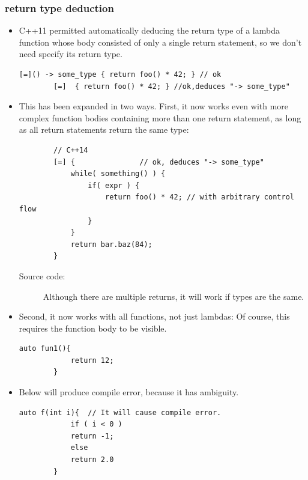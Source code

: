 \documentclass[a4paper,11pt,twoside]{book}
\begin{document}
\subsubsection{return type deduction}
\begin{itemize}
	\item C++11 permitted automatically deducing the return type of a lambda function whose body consisted of only a single return statement, so we don't need specify its return type.
	\begin{lstlisting}[numbers=none]
		[=]() -> some_type { return foo() * 42; } // ok
		[=]  { return foo() * 42; } //ok,deduces "-> some_type"
	\end{lstlisting}
	
	\item This has been expanded in two ways. First, it now works even with more complex function bodies containing more than one return statement, as long as all return statements return the same type:
	\begin{lstlisting}
		// C++14
		[=] {               // ok, deduces "-> some_type"
			while( something() ) {
				if( expr ) {
					return foo() * 42; // with arbitrary control flow
				}
			}
			return bar.baz(84); 
		}                       
	\end{lstlisting}
	\begin{description}
		\item[Source code:] Although there are multiple returns, it will work if types are the same.
	\end{description}
	
	\item Second, it now works with all functions, not just lambdas: Of course, this requires the function body to be visible.
	\begin{lstlisting}[numbers=none]
		auto fun1(){
			return 12;
		}
	\end{lstlisting}
	
	\item Below will produce compile error, because it has ambiguity.
	\begin{lstlisting}[numbers=none]
		auto f(int i){  // It will cause compile error.
			if ( i < 0 )
			return -1;
			else
			return 2.0
		}
	\end{lstlisting}
	
\end{itemize}
\end{document}

